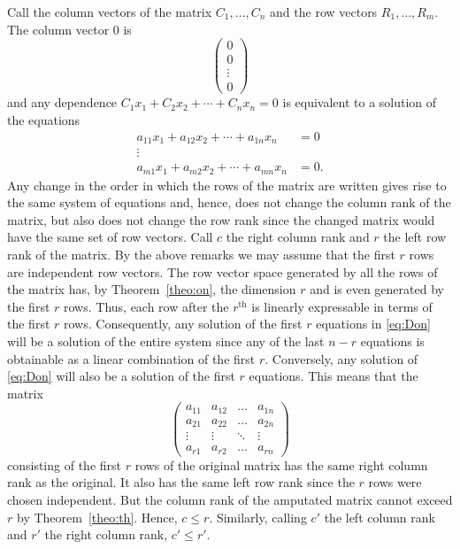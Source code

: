\documentclass[11pt]{article}
\theoremstyle{definition}
\begin{document}
Call the column vectors of the matrix $C_1, \ldots, C_n$ and the row vectors $R_1, \ldots, R_m$.
The column vector $0$ is
\[
\begin{pmatrix}
0 \\ 0 \\ \vdots \\ 0
\end{pmatrix}
\]
and any dependence $C_1 x_1 + C_2 x_2 + \cdots + C_n x_n = 0$ is equivalent to a solution of the equations
\begin{equation}
\label{eq:Don}
\begin{aligned}
a_{11}x_1 + a_{12}x_2 + \cdots + a_{1n}x_n &= 0
\\
\vdots &
\\
a_{m1}x_1 + a_{m2}x_2 + \cdots + a_{mn}x_n &= 0.
\end{aligned}
\end{equation}
Any change in the order in which the rows of the matrix are written gives rise to the same system of equations and, hence, does not change the column rank of the matrix, but also does not change the row rank since the changed matrix would have the same set of row vectors.
Call $c$ the right column rank and $r$ the left row rank of the matrix.
By the above remarks we may assume that the first $r$ rows are independent row vectors.
The row vector space generated by all the rows of the matrix has, by Theorem~\ref{theo:on}, the dimension $r$ and is even generated by the first $r$ rows.
Thus, each row after the $r^{\text{th}}$ is linearly expressable in terms of the first $r$ rows.
Consequently, any solution of the first $r$ equations in \eqref{eq:Don} will be a solution of the entire system since any of the last $n-r$ equations is obtainable as a linear combination of the first $r$.
Conversely, any solution of \eqref{eq:Don} will also be a solution of the first $r$ equations.
This means that the matrix
\[
\begin{pmatrix}
a_{11} & a_{12} & \ldots & a_{1n}
\\
a_{21} & a_{22} & \ldots & a_{2n}
\\
\vdots & \vdots & \ddots & \vdots
\\
a_{r1} & a_{r2} & \ldots & a_{rn}
\end{pmatrix}
\]
consisting of the first $r$ rows of the original matrix has the same right column rank as the original.
It also has the same left row rank since the $r$ rows were chosen independent.
But the column rank of the amputated matrix cannot exceed $r$ by Theorem~\ref{theo:th}.
Hence, $c \leq r$.
Similarly, calling $c'$ the left column rank and $r'$ the right column rank, $c' \leq r'$.
\end{document}

